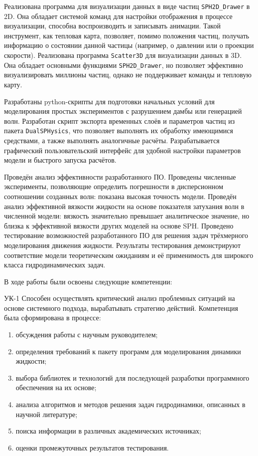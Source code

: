 Реализована программа для визуализации данных в виде частиц \verb|SPH2D_Drawer| в 2D.
%
Она обладает системой команд для настройки отображения в процессе визуализации, 
способна воспроизводить и записывать анимации. 
%
Такой инструмент, как тепловая карта, позволяет, помимо положения частиц, получать информацию о состоянии данной частицы 
(например, о давлении или о проекции скорости).
%
Реализована программа \verb|Scatter3D| для визуализации данных в 3D. 
%
Она обладает основными функциями \verb|SPH2D_Drawer|, 
но позволяет эффективно визуализировать миллионы частиц,
однако не поддерживает команды и тепловую карту.

Разработаны python-скрипты для подготовки начальных условий для моделирования
простых экспериментов с разрушением дамбы или генерацией волн. 
%
Разработан скрипт экспорта временных слоёв и параметров частиц из пакета \verb|DualSPHysics|,
что позволяет выполнять их обработку имеющимися средствами,
а также выполнять аналогичные расчёты.
%
Разрабатывается графический пользовательский интерфейс для удобной настройки параметров модели
и быстрого запуска расчётов.

Проведён анализ эффективности разработанного ПО.
%
Проведены численные эксперименты, 
позволяющие определить погрешности в дисперсионном соотношении созданных волн:
показана высокая точность модели.
%
Проведён анализ эффективной вязкости жидкости на основе показателя затухания волн в численной модели:
вязкость значительно превышает аналитическое значение, 
но близка к эффективной вязкости других моделей на основе SPH.
%
Проведено тестирование возможностей разработанного ПО для решения задач трёхмерного моделирования движения жидкости.
%
Результаты тестирования демонстрируют соответствие модели теоретическим ожиданиям и 
её применимость для широкого класса гидродинамических задач.

В ходе работы были освоены следующие компетенции:

УК-1 Способен осуществлять критический анализ проблемных ситуаций на основе системного подхода, вырабатывать стратегию действий.
Компетенция была сформирована в процессе:
\begin{enumerate}
    \item обсуждения работы с научным руководителем;
    \item определения требований к пакету программ для моделирования динамики жидкости;
    \item выбора библиотек и технологий для последующей разработки программного обеспечения на их основе;
    \item анализа алгоритмов и методов решения задач гидродинамики, описанных в научной литературе;
    \item поиска информации в различных академических источниках;
    \item оценки промежуточных результатов тестирования.
\end{enumerate}

